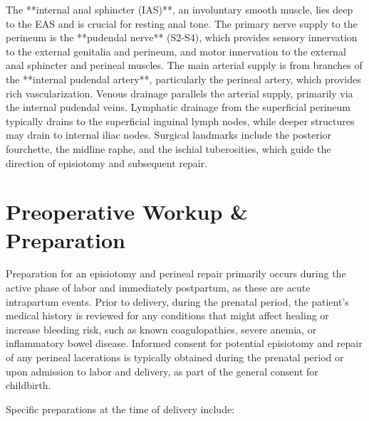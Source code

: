The **internal anal sphincter (IAS)**, an involuntary smooth muscle, lies deep to the EAS and is crucial for resting anal tone. The primary nerve supply to the perineum is the **pudendal nerve** (S2-S4), which provides sensory innervation to the external genitalia and perineum, and motor innervation to the external anal sphincter and perineal muscles. The main arterial supply is from branches of the **internal pudendal artery**, particularly the perineal artery, which provides rich vascularization. Venous drainage parallels the arterial supply, primarily via the internal pudendal veins. Lymphatic drainage from the superficial perineum typically drains to the superficial inguinal lymph nodes, while deeper structures may drain to internal iliac nodes. Surgical landmarks include the posterior fourchette, the midline raphe, and the ischial tuberosities, which guide the direction of episiotomy and subsequent repair.

\section*{Preoperative Workup \& Preparation}
Preparation for an episiotomy and perineal repair primarily occurs during the active phase of labor and immediately postpartum, as these are acute intrapartum events. Prior to delivery, during the prenatal period, the patient's medical history is reviewed for any conditions that might affect healing or increase bleeding risk, such as known coagulopathies, severe anemia, or inflammatory bowel disease. Informed consent for potential episiotomy and repair of any perineal lacerations is typically obtained during the prenatal period or upon admission to labor and delivery, as part of the general consent for childbirth.

Specific preparations at the time of delivery include:


